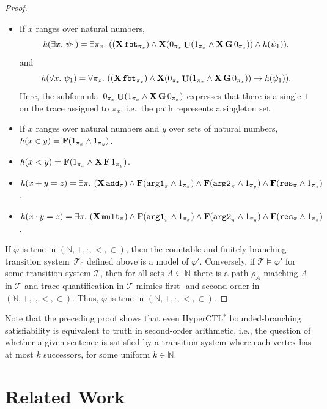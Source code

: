\documentclass[dvipsnames,10pt,a4paper]{amsart}
\theoremstyle{definition}
\theoremstyle{remark}
\newcommand{\nats}{\mathbb{N}}
\newcommand\Nat{\nats}
\newcommand{\tsys}{\mathcal{T}}
\newcommand{\F}{\mathop{\mathbf{F}\vphantom{a}}\nolimits}
\newcommand{\G}{\mathop{\mathbf{G}\vphantom{a}}\nolimits}
\DeclareMathOperator{\U}{\mathbf{U}}
\newcommand{\X}{\mathop{\mathbf{X}\vphantom{a}}\nolimits}
\newcommand{\hyctlstar}{{HyperCTL$^*$}\xspace}
\newcommand\argl{\textup{\texttt{arg1}}}
\newcommand\argr{\textup{\texttt{arg2}}}
\newcommand\res{\textup{\texttt{res}}}
\newcommand\add{\textup{\texttt{add}}}
\newcommand\mult{\textup{\texttt{mult}}}
\newcommand\fbt{\textup{\texttt{fbt}}}
\newcommand\xo{x}
\newcommand\yo{y}
\newcommand\zo{z}
\newcommand\yt{y}
\newcommand\pix[1]{\pi_{#1}}
\newcommand\tr [1]{\mathit{h}(#1)}
\newcommand\tsysc{\tsys_0}
\begin{document}
\begin{proof}
\begin{itemize}
  \item If $x$ ranges over natural numbers, 
    \[\tr {\exists x.\ \psi_1} = \exists \pix x.\ ((\X \fbt_{\pix x}) \land
    \X (0_{\pix x} \U (1_{\pix x} \land \X\G 0_{\pix x})) \land \tr  {\psi_1}),\]
    and
    \[\tr {\forall x.\ \psi_1} = \forall \pix x.\ ((\X \fbt_{\pix x}) \land
    \X (0_{\pix x} \U (1_{\pix x} \land \X\G 0_{\pix x})) \rightarrow \tr  {\psi_1}).\] 
    Here, the subformula~$0_{\pix x} \U (1_{\pix x} \land \X\G 0_{\pix x})$ expresses that there is a single $1$ on the trace assigned to $\pix x$, i.e.\ the path represents a singleton set.
  \item If $\xo$ ranges over natural numbers and $\yt$ over sets of natural
    numbers, $\tr {\xo \in \yt} = \F(1_{\pix \xo} \land 1_{\pix \yt})$.
  \item $\tr {\xo < \yo} = \F(1_{\pix \xo} \land \X \F 1_{\pix \yo})$.
  \item $\tr {\xo + \yo = \zo} = \exists \pi.\ (\X \add_\pi) \land \F(\argl_\pi \land 1_{\pix \xo}) \land
    \F(\argr_{\pi} \land 1_{\pix \yo}) \land \F(\res_\pi \land 1_{\pix \zo})$.
   \item  $\tr {\xo\cdot\yo = \zo} =
    \exists \pi.\ (\X \mult_\pi) \land \F(\argl_\pi \land 1_{\pix \xo}) \land
    \F(\argr_{\pi} \land 1_{\pix \yo}) \land \F(\res_\pi \land 1_{\pix \zo})$.
  \end{itemize}

  If $\varphi$ is true in $(\Nat, +, \cdot, <,\in)$,
  then the countable and finitely-branching transition system~$\tsysc$ defined above is a model of $\varphi'$.
  Conversely, if $\tsys \models \varphi'$ for some transition system $\tsys$,
  then for all sets $A \subseteq \Nat$ there is a path $\rho_A$ matching $A$ in $\tsys$ and trace quantification in $\tsys$ mimics first- and second-order in $(\Nat, +, \cdot, <,\in)$.
  Thus, $\varphi$ is true in $(\Nat, +, \cdot, <,\in)$.
\end{proof}

Note that the preceding proof shows that even \hyctlstar bounded-branching satisfiability is equivalent to truth in second-order arithmetic, i.e., the question of whether a given sentence is satisfied by a transition system where each vertex has at most $k$ successors, for some uniform $k \in \nats$.



\section{Related Work}
\label{sec:relatedwork}
\end{document}

